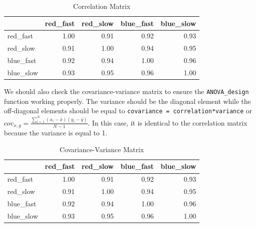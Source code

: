 \documentclass[
]{book}
\newenvironment{Shaded}{\begin{snugshade}}{\end{snugshade}}
\newcommand{\NormalTok}[1]{#1}
\newcommand{\OperatorTok}[1]{\textcolor[rgb]{0.81,0.36,0.00}{\textbf{#1}}}
\begin{document}
\begin{Shaded}
\end{Shaded}

\begin{table}[!h]

\caption{\label{tab:unnamed-chunk-6}Correlation Matrix}
\centering
\begin{tabular}[t]{l|r|r|r|r}
\hline
  & red\_fast & red\_slow & blue\_fast & blue\_slow\\
\hline
red\_fast & 1.00 & 0.91 & 0.92 & 0.93\\
\hline
red\_slow & 0.91 & 1.00 & 0.94 & 0.95\\
\hline
blue\_fast & 0.92 & 0.94 & 1.00 & 0.96\\
\hline
blue\_slow & 0.93 & 0.95 & 0.96 & 1.00\\
\hline
\end{tabular}
\end{table}

We should also check the covariance-variance matrix to ensure the \texttt{ANOVA\_design} function working properly.
The variance should be the diagonal element while the off-diagonal elements should be equal to \texttt{covariance\ =\ correlation*variance} or \(cov_{x,y}=\frac{\sum_{i=1}^{N}(x_{i}-\bar{x})(y_{i}-\bar{y})}{N-1}\).
In this case, it is identical to the correlation matrix because the variance is equal to 1.

\begin{Shaded}
\end{Shaded}

\begin{table}[!h]

\caption{\label{tab:unnamed-chunk-8}Covariance-Variance Matrix}
\centering
\begin{tabular}[t]{l|r|r|r|r}
\hline
  & red\_fast & red\_slow & blue\_fast & blue\_slow\\
\hline
red\_fast & 1.00 & 0.91 & 0.92 & 0.93\\
\hline
red\_slow & 0.91 & 1.00 & 0.94 & 0.95\\
\hline
blue\_fast & 0.92 & 0.94 & 1.00 & 0.96\\
\hline
blue\_slow & 0.93 & 0.95 & 0.96 & 1.00\\
\hline
\end{tabular}
\end{table}
\end{document}
